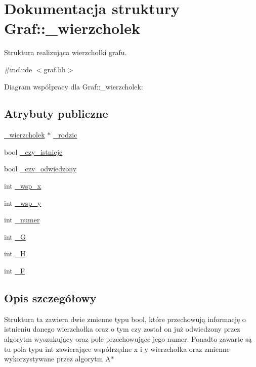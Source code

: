 \hypertarget{struct_graf_1_1__wierzcholek}{\section{\-Dokumentacja struktury \-Graf\-:\-:\-\_\-wierzcholek}
\label{struct_graf_1_1__wierzcholek}
}


\-Struktura realizująca wierzchołki grafu.  




{\ttfamily \#include $<$graf.\-hh$>$}



\-Diagram współpracy dla \-Graf\-:\-:\-\_\-wierzcholek\-:
\subsection*{\-Atrybuty publiczne}
\begin{DoxyCompactItemize}
\item 
\hyperlink{struct_graf_1_1__wierzcholek}{\-\_\-wierzcholek} $\ast$ \hyperlink{struct_graf_1_1__wierzcholek_a40e49e554e1b5071ea756d68a7ad06d0}{\-\_\-rodzic}
\item 
bool \hyperlink{struct_graf_1_1__wierzcholek_a157d209583d1813f1a609cfb08682ffe}{\-\_\-czy\-\_\-istnieje}
\item 
bool \hyperlink{struct_graf_1_1__wierzcholek_a818c370b6e8a476f6fb9f89ccac01e2f}{\-\_\-czy\-\_\-odwiedzony}
\item 
int \hyperlink{struct_graf_1_1__wierzcholek_a21ade81ba66bf560548f2ed5d09932e0}{\-\_\-wsp\-\_\-x}
\item 
int \hyperlink{struct_graf_1_1__wierzcholek_a8480b0d0566935fa8687c6dd7b8fa94a}{\-\_\-wsp\-\_\-y}
\item 
int \hyperlink{struct_graf_1_1__wierzcholek_a966ecd51ba3e337c8b67587cffab7f9a}{\-\_\-numer}
\item 
int \hyperlink{struct_graf_1_1__wierzcholek_a2a704ec25dec8c72c17449cc4b9ab8bb}{\-\_\-\-G}
\item 
int \hyperlink{struct_graf_1_1__wierzcholek_a70af2c227ab7c1b38106fb84c005da7e}{\-\_\-\-H}
\item 
int \hyperlink{struct_graf_1_1__wierzcholek_a2b1a8e8fbeb43a968c2dcfed212a4318}{\-\_\-\-F}
\end{DoxyCompactItemize}


\subsection{\-Opis szczegółowy}
\-Struktura ta zawiera dwie zmienne typu bool, które przechowują informację o istnieniu danego wierzchołka oraz o tym czy został on już odwiedzony przez algorytm wyszukujący oraz pole przechowujące jego numer. \-Ponadto zawarte są tu pola typu int zawierające współrzędne x i y wierzchołka oraz zmienne wykorzystywane przez algorytm \-A$\ast$ 

